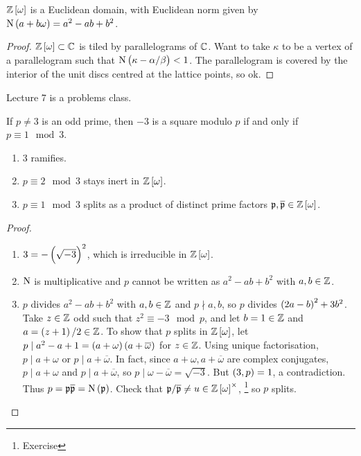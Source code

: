 \begin{theorem}
$ \ZZ\sbr{\omega} $ is a Euclidean domain, with Euclidean norm given by $ \N\br{a + b\omega} = a^2 - ab + b^2 $.
\end{theorem}

\begin{proof}
$ \ZZ\sbr{\omega} \subset \CC $ is tiled by parallelograms of $ \mathbb{C} $. Want to take $ \kappa $ to be a vertex of a parallelogram such that $ \N\br{\kappa - \alpha / \beta} < 1 $. The parallelogram is covered by the interior of the unit discs centred at the lattice points, so ok.
\end{proof}


Lecture 7 is a problems class.


\begin{lemma}
If $ p \ne 3 $ is an odd prime, then $ -3 $ is a square modulo $ p $ if and only if $ p \equiv 1 \mod 3 $.
\end{lemma}

\pagebreak

\begin{theorem}
\hfill
\begin{enumerate}
\item $ 3 $ ramifies.
\item $ p \equiv 2 \mod 3 $ stays inert in $ \ZZ\sbr{\omega} $.
\item $ p \equiv 1 \mod 3 $ splits as a product of distinct prime factors $ \ppp, \overline{\ppp} \in \ZZ\sbr{\omega} $.
\end{enumerate}
\end{theorem}

\begin{proof}
\hfill
\begin{enumerate}
\item $ 3 = -\br{\sqrt{-3}}^2 $, which is irreducible in $ \ZZ\sbr{\omega} $.
\item $ \mathrm{N} $ is multiplicative and $ p $ cannot be written as $ a^2 - ab + b^2 $ with $ a, b \in \mathbb{Z} $.
\item $ p $ divides $ a^2 - ab + b^2 $ with $ a, b \in \mathbb{Z} $ and $ p \nmid a, b $, so $ p $ divides $ \br{2a - b}^2 + 3b^2 $. Take $ z \in \mathbb{Z} $ odd such that $ z^2 \equiv -3 \mod p $, and let $ b = 1 \in \mathbb{Z} $ and $ a = \br{z + 1} / 2 \in \ZZ $. To show that $ p $ splits in $ \ZZ\sbr{\omega} $, let $ p \mid a^2 - a + 1 = \br{a + \omega}\br{a + \overline{\omega}} $ for $ z \in \mathbb{Z} $. Using unique factorisation, $ p \mid a + \omega $ or $ p \mid a + \overline{\omega} $. In fact, since $ a + \omega, a + \overline{\omega} $ are complex conjugates, $ p \mid a + \omega $ and $ p \mid a + \overline{\omega} $, so $ p \mid \omega - \overline{\omega} = \sqrt{-3} $. But $ \br{3, p} = 1 $, a contradiction. Thus $ p = \ppp\overline{\ppp} = \N\br{\ppp} $. Check that $ \ppp / \overline{\ppp} \ne u \in \ZZ\sbr{\omega}^\times $, \footnote{Exercise} so $ p $ splits.
\end{enumerate}
\end{proof}

